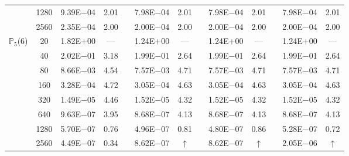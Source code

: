 \begin{table}[H]
{\begin{tabular}{@{}l c c c c c c c c c c c c@{}}
 & 1280 & 9.39E$-$04 & 2.01 &  & 7.98E$-$04 & 2.01 &  & 7.98E$-$04 & 2.01 &  & 7.98E$-$04 & 2.01\\
 & 2560 & 2.35E$-$04 & 2.00 &  & 2.00E$-$04 & 2.00 &  & 2.00E$-$04 & 2.00 &  & 2.00E$-$04 & 2.00\\
\midrule
\multirow{8}{*}{$\mathbb{P}_{5}$(6)}
 & 20 & 1.82E$+$00 & --- &  & 1.24E$+$00 & --- &  & 1.24E$+$00 & --- &  & 1.24E$+$00 & ---\\
 & 40 & 2.02E$-$01 & 3.18 &  & 1.99E$-$01 & 2.64 &  & 1.99E$-$01 & 2.64 &  & 1.99E$-$01 & 2.64\\
 & 80 & 8.66E$-$03 & 4.54 &  & 7.57E$-$03 & 4.71 &  & 7.57E$-$03 & 4.71 &  & 7.57E$-$03 & 4.71\\
 & 160 & 3.28E$-$04 & 4.72 &  & 3.05E$-$04 & 4.63 &  & 3.05E$-$04 & 4.63 &  & 3.05E$-$04 & 4.63\\
 & 320 & 1.49E$-$05 & 4.46 &  & 1.52E$-$05 & 4.32 &  & 1.52E$-$05 & 4.32 &  & 1.52E$-$05 & 4.32\\
 & 640 & 9.63E$-$07 & 3.95 &  & 8.68E$-$07 & 4.13 &  & 8.68E$-$07 & 4.13 &  & 8.68E$-$07 & 4.13\\
 & 1280 & 5.70E$-$07 & 0.76 &  & 4.96E$-$07 & 0.81 &  & 4.80E$-$07 & 0.86 &  & 5.28E$-$07 & 0.72\\
 & 2560 & 4.49E$-$07 & 0.34 &  & 8.62E$-$07 & $\uparrow$ &  & 8.62E$-$07 & $\uparrow$ &  & 2.05E$-$06 & $\uparrow$\\
\bottomrule
\end{tabular}}
\label{PRO:bending:01_01_glob6_pro2}
\end{table}
